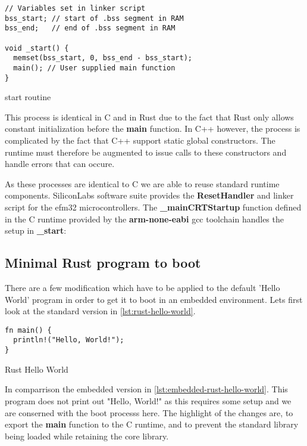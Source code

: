 \begin{listing}[H]
\begin{verbatim}
// Variables set in linker script
bss_start; // start of .bss segment in RAM
bss_end;   // end of .bss segment in RAM

void _start() {
  memset(bss_start, 0, bss_end - bss_start);
  main(); // User supplied main function
}
\end{verbatim}
\caption{start routine}
\label{lst:start}
\end{listing}

This process is identical in C and in Rust due to the fact that Rust only allows constant initialization before the \textbf{main} function.
In C++ however, the process is complicated by the fact that C++ support static global constructors.
The runtime must therefore be augmented to issue calls to these constructors and handle errors that can occure.

As these processes are identical to C we are able to reuse standard runtime components.
SiliconLabs software suite provides the \textbf{ResetHandler} and linker script for the efm32 microcontrollers.
The \textbf{\_mainCRTStartup} function defined in the C runtime provided by the \textbf{arm-none-eabi} gcc toolchain handles the setup in \textbf{\_start}:

\subsection{Minimal Rust program to boot}

There are a few modification which have to be applied to the default 'Hello World' program in order to get it to boot in an embedded environment.
Lets first look at the standard version in \autoref{lst:rust-hello-world}.

\begin{listing}[H]
\begin{verbatim}
fn main() {
  println!("Hello, World!");
}
\end{verbatim}
\label{lst:rust-hello-world}
\caption{Rust Hello World}
\end{listing}

In comparrison the embedded version in \autoref{lst:embedded-rust-hello-world}.
This program does not print out "Hello, World!" as this requires some setup and we are conserned with the boot processs here.
The highlight of the changes are, to export the \textbf{main} function to the C runtime, and to prevent the standard library being loaded while retaining the core library.


